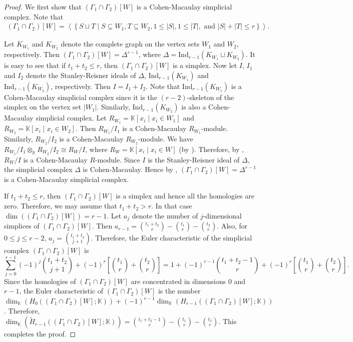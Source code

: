 \documentclass[12pt,reqno]{amsart}
\theoremstyle{definition}
\newcommand{\K}{\mathbb K}
\newcommand{\intersectionw}{(\Gamma_1\cap\Gamma_2)[W]}
\begin{document}
\begin{proof}
    We first show that $\intersectionw$ is a Cohen-Macaulay simplicial complex. Note that
    {\footnotesize
\begin{align*}
    (\Gamma_1\cap\Gamma_2)[W]= \left\langle\left\{S\sqcup T\mid S\subseteq W_1, T\subseteq W_2, 1\le |S|, 1\le |T|, \text{ and } |S|+|T|\le r\right\}\right\rangle.
\end{align*}}

Let $K_{W_1}$ and $K_{W_2}$ denote the complete graph on the vertex sets $W_1$ and $W_2$, respectively. Then $\intersectionw=\Delta^{r-1}$, where $\Delta=\mathrm{Ind}_{r-1}(K_{W_1}\sqcup K_{W_2})$. It is easy to see that if $t_1+t_2\le r$, then $\intersectionw$ is a simplex. Now let $I$, $I_1$ and $I_2$ denote the Stanley-Reisner ideals of $\Delta$, $\mathrm{Ind}_{r-1}(K_{W_1})$ and $\mathrm{Ind}_{r-1}(K_{W_2})$, respectively. Then $I=I_1+I_2$. Note that $\mathrm{Ind}_{r-1}(K_{W_1})$ is a Cohen-Macaulay simplicial complex since it is the $(r-2)$-skeleton of the simplex on the vertex set $|W_1|$. Similarly, $\mathrm{Ind}_{r-1}(K_{W_2})$ is also a Cohen-Macaulay simplicial complex. Let $R_{W_1}=\K[x_i\mid x_i\in W_1]$ and $R_{W_2}=\K[x_i\mid x_i\in W_2]$. Then $R_{W_1}/I_1$ is a Cohen-Macaulay $R_{W_1}$-module. Similarly, $R_{W_2}/I_2$ is a Cohen-Macaulay $R_{W_2}$-module. We have $R_{W_1}/I_1\otimes_{\K}R_{W_2}/I_2\cong R_W/I$, where $R_W=\K[x_i\mid x_i\in W]$ (by \cite[Proposition 2.2.20]{RHV}). Therefore, by \cite[Corollary 2.2.22]{RHV}, $R_W/I$ is a Cohen-Macaulay $R$-module. Since $I$ is the Stanley-Reisner ideal of $\Delta$, the simplicial complex $\Delta$ is Cohen-Macaulay. Hence by \cite[Proposition 5.3.14]{RHV}, $\intersectionw=\Delta^{r-1}$ is a Cohen-Macaulay simplicial complex.

If $t_1+t_2\le r$, then $\intersectionw$ is a simplex and hence all the homologies are zero. Therefore, we may assume that $t_1+t_2>r$. In that case $\dim(\intersectionw)=r-1$. Let $a_j$ denote the number of $j$-dimensional simplices of $\intersectionw$. Then $a_{r-1}={t_1+t_2\choose r}-{t_1\choose r}-{t_2\choose r}$. Also, for $0\le j\le r-2$, $a_j={t_1+t_2\choose j+1}$. Therefore, the Euler characteristic of the simplicial complex $\intersectionw$ is
{\footnotesize
\[
\sum_{j=0}^{r-1}(-1)^j{t_1+t_2\choose j+1}+(-1)^r\left[{t_1\choose r}+{t_2\choose r}\right]=1+(-1)^{r-1}{t_1+t_2-1\choose r}+(-1)^r\left[{t_1\choose r}+{t_2\choose r}\right].
\]
}
Since the homologies of $\intersectionw$ are concentrated in dimensions $0$ and $r-1$, the Euler characteristic of $\intersectionw$ is the number $\dim_{\K}(H_0((\Gamma_1\cap\Gamma_2)[W];\K))+(-1)^{r-1}\dim_{\K}(H_{r-1}((\Gamma_1\cap\Gamma_2)[W];\K))$. Therefore, $\dim_{\K}(\widetilde H_{r-1}((\Gamma_1\cap\Gamma_2)[W];\K))={t_1+t_2-1\choose r}-{t_1\choose r}-{t_2\choose r}$. This completes the proof.
\end{proof}
\end{document}
